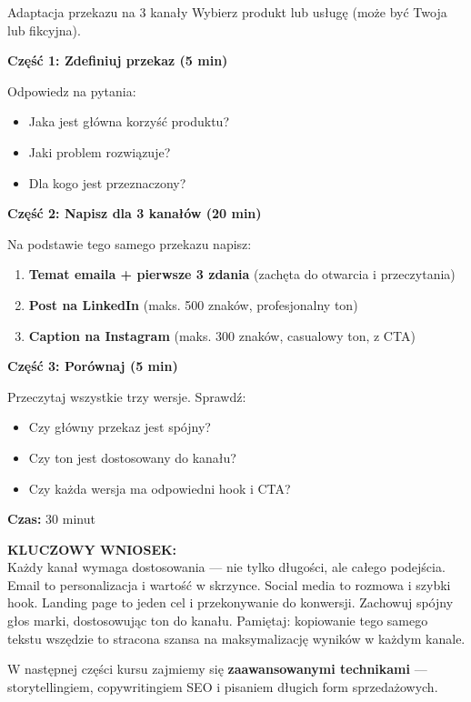 \documentclass[
  12pt,
  a4paper,
  twoside,
  openright,
  12pt,
  DIV=12,
  BCOR=12mm]{scrbook}
\newcommand{\takeaway}[1]{%
  \begin{tcolorbox}[
    enhanced,
    colback=accentgreen!10,
    colframe=accentgreen,
    boxrule=0pt,
    borderline south={3pt}{0pt}{accentgreen},
    sharp corners,
    left=15pt, right=15pt, top=10pt, bottom=10pt
  ]
    \textbf{\color{accentgreen}KLUCZOWY WNIOSEK:}\\[5pt]
    #1
  \end{tcolorbox}
}
\begin{document}
\begin{cwiczenie}{Adaptacja przekazu na 3 kanały}
Wybierz produkt lub usługę (może być Twoja lub fikcyjna).

\textbf{Część 1: Zdefiniuj przekaz (5 min)}

Odpowiedz na pytania:
\begin{itemize}
  \item Jaka jest główna korzyść produktu?
  \item Jaki problem rozwiązuje?
  \item Dla kogo jest przeznaczony?
\end{itemize}

\textbf{Część 2: Napisz dla 3 kanałów (20 min)}

Na podstawie tego samego przekazu napisz:

\begin{enumerate}
  \item \textbf{Temat emaila + pierwsze 3 zdania} (zachęta do otwarcia i przeczytania)
  \item \textbf{Post na LinkedIn} (maks. 500 znaków, profesjonalny ton)
  \item \textbf{Caption na Instagram} (maks. 300 znaków, casualowy ton, z CTA)
\end{enumerate}

\textbf{Część 3: Porównaj (5 min)}

Przeczytaj wszystkie trzy wersje. Sprawdź:
\begin{itemize}
  \item Czy główny przekaz jest spójny?
  \item Czy ton jest dostosowany do kanału?
  \item Czy każda wersja ma odpowiedni hook i CTA?
\end{itemize}

\textbf{Czas:} 30 minut
\end{cwiczenie}

\takeaway{Każdy kanał wymaga dostosowania --- nie tylko długości, ale całego podejścia. Email to personalizacja i wartość w skrzynce. Social media to rozmowa i szybki hook. Landing page to jeden cel i przekonywanie do konwersji. Zachowuj spójny głos marki, dostosowując ton do kanału. Pamiętaj: kopiowanie tego samego tekstu wszędzie to stracona szansa na maksymalizację wyników w każdym kanale.}

W następnej części kursu zajmiemy się \textbf{zaawansowanymi technikami}
--- storytellingiem, copywritingiem SEO i pisaniem długich form
sprzedażowych.
\end{document}

